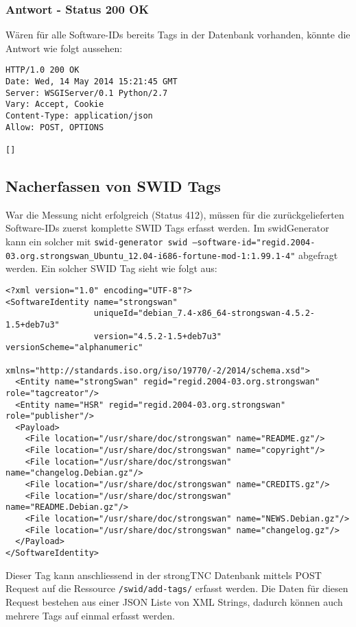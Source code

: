 \documentclass[10pt,a4paper]{scrartcl}
\begin{document}
\subsubsection{Antwort - Status 200 OK}
Wären für alle Software-IDs bereits Tags in der Datenbank vorhanden, könnte die Antwort wie folgt aussehen:
\begin{lstlisting}
HTTP/1.0 200 OK
Date: Wed, 14 May 2014 15:21:45 GMT
Server: WSGIServer/0.1 Python/2.7
Vary: Accept, Cookie
Content-Type: application/json
Allow: POST, OPTIONS

[]
\end{lstlisting}

\subsection{Nacherfassen von SWID Tags}
War die Messung nicht erfolgreich (Status 412), müssen für die zurückgelieferten Software-IDs zuerst komplette SWID Tags erfasst werden.
Im swidGenerator kann ein solcher mit \texttt{swid-generator swid --software-id="regid.2004-03.org.strongswan\_Ubuntu\_12.04-i686-fortune-mod-1:1.99.1-4"} abgefragt werden.
Ein solcher SWID Tag sieht wie folgt aus:

\lstset{language=XML}
\begin{lstlisting}
<?xml version="1.0" encoding="UTF-8"?>
<SoftwareIdentity name="strongswan" 
				  uniqueId="debian_7.4-x86_64-strongswan-4.5.2-1.5+deb7u3" 
				  version="4.5.2-1.5+deb7u3" versionScheme="alphanumeric" 
				  xmlns="http://standards.iso.org/iso/19770/-2/2014/schema.xsd">
  <Entity name="strongSwan" regid="regid.2004-03.org.strongswan" role="tagcreator"/>
  <Entity name="HSR" regid="regid.2004-03.org.strongswan" role="publisher"/>
  <Payload>
    <File location="/usr/share/doc/strongswan" name="README.gz"/>
    <File location="/usr/share/doc/strongswan" name="copyright"/>
    <File location="/usr/share/doc/strongswan" name="changelog.Debian.gz"/>
    <File location="/usr/share/doc/strongswan" name="CREDITS.gz"/>
    <File location="/usr/share/doc/strongswan" name="README.Debian.gz"/>
    <File location="/usr/share/doc/strongswan" name="NEWS.Debian.gz"/>
    <File location="/usr/share/doc/strongswan" name="changelog.gz"/>
  </Payload>
</SoftwareIdentity>

\end{lstlisting}

Dieser Tag kann anschliessend in der strongTNC Datenbank mittels POST Request auf die Ressource \texttt{/swid/add-tags/} erfasst werden. Die Daten für diesen Request bestehen aus einer JSON Liste von XML Strings, dadurch können auch mehrere Tags auf einmal erfasst werden. 
\end{document}
